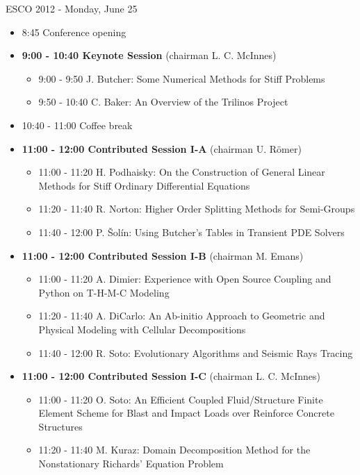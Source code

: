 \documentclass[10pt, A4]{article}%
\begin{document}
\centerline{\huge ESCO 2012 - Monday, June 25}
\vspace{4mm}

\begin{itemize}    
  \item 8:45 Conference opening
  \item {\bf 9:00 - 10:40 Keynote Session} (chairman L. C. McInnes) 
  \begin{itemize}
    \item 9:00 - 9:50 J. Butcher: Some Numerical Methods for Stiff Problems
    \item 9:50 - 10:40 C. Baker: An Overview of the Trilinos Project
  \end{itemize}
  \item 10:40 - 11:00 Coffee break
  \item {\bf 11:00 - 12:00 Contributed Session I-A} (chairman U. R\"{o}mer) 
  \begin{itemize}
    \item 11:00 - 11:20 H. Podhaisky: On the Construction of General Linear Methods for Stiff Ordinary Differential Equations
    \item 11:20 - 11:40 R. Norton: Higher Order Splitting Methods for Semi-Groups
    \item 11:40 - 12:00 P. \v{S}ol\'{i}n: Using Butcher’s Tables in Transient PDE Solvers
  \end{itemize}
  \item {\bf 11:00 - 12:00 Contributed Session I-B} (chairman M. Emans) 
  \begin{itemize}
    \item 11:00 - 11:20 A. Dimier: Experience with Open Source Coupling and Python on T-H-M-C Modeling
    \item 11:20 - 11:40 A. DiCarlo: An Ab-initio Approach to Geometric and Physical Modeling with Cellular Decompositions 
    \item 11:40 - 12:00 R. Soto: Evolutionary Algorithms and Seismic Rays Tracing
  \end{itemize}
  \item {\bf 11:00 - 12:00 Contributed Session I-C} (chairman L. C. McInnes) 
  \begin{itemize}
    \item 11:00 - 11:20 O. Soto: An Efficient Coupled Fluid/Structure Finite Element Scheme for Blast and Impact Loads over Reinforce Concrete Structures
    \item 11:20 - 11:40 M. Kuraz: Domain Decomposition Method for the Nonstationary Richards’ Equation Problem  

\end{itemize}
\end{itemize}
\end{document}
